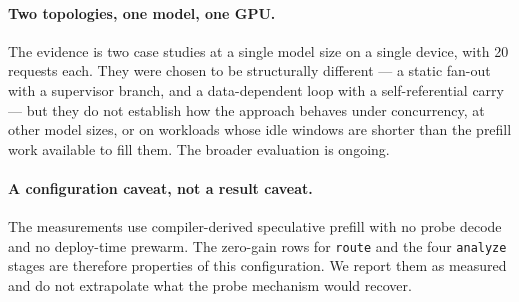 \paragraph{Two topologies, one model, one GPU.} The evidence is two case studies
at a single model size on a single device, with 20 requests each. They were chosen
to be structurally different --- a static fan-out with a supervisor branch, and a
data-dependent loop with a self-referential carry --- but they do not establish
how the approach behaves under concurrency, at other model sizes, or on workloads
whose idle windows are shorter than the prefill work available to fill them. The
broader evaluation is ongoing.

\paragraph{A configuration caveat, not a result caveat.} The measurements use
compiler-derived speculative prefill with no probe decode and no deploy-time
prewarm. The zero-gain rows for \texttt{route} and the four \texttt{analyze}
stages are therefore properties of this configuration. We report them as measured
and do not extrapolate what the probe mechanism would recover.
